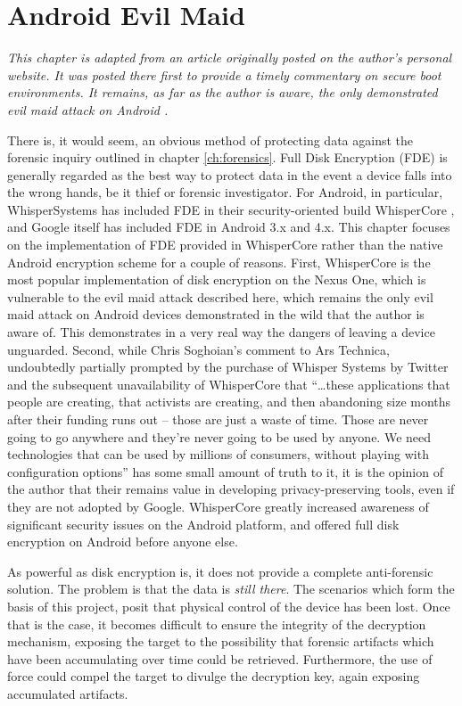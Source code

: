 \chapter{Android Evil Maid}
\label{ch:fde}

\emph{This chapter is adapted from an article originally posted on the author's personal website. It was posted there first to
provide a timely commentary on secure boot environments. It remains, as far as the author is aware, the only demonstrated evil maid
attack on Android \cite{androidevilmaid}.}

There is, it would seem, an obvious method of protecting data against the forensic inquiry outlined in chapter \ref{ch:forensics}.
Full Disk Encryption (FDE) is generally regarded as the best way to protect data in the event a device falls into the wrong hands,
be it thief or forensic investigator.  For Android, in particular, WhisperSystems has included FDE in their security-oriented build
WhisperCore \cite{whispercore}, and Google itself has included FDE in Android 3.x and 4.x. This chapter focuses on the
implementation of FDE provided in WhisperCore rather than the native Android encryption scheme for a couple of reasons. First,
WhisperCore is the most popular implementation of disk encryption on the Nexus One, which is vulnerable to the evil maid attack
described here, which remains the only evil maid attack on Android devices demonstrated in the wild that the author is aware of.
This demonstrates in a very real way the dangers of leaving a device unguarded. Second, while Chris Soghoian's comment to Ars
Technica, undoubtedly partially prompted by the purchase of Whisper Systems by Twitter and the subsequent unavailability of
WhisperCore that ``\ldots these applications that people are creating, that activists are creating, and then
abandoning size months after their funding runs out -- those are just a waste of time. Those are never going to go anywhere and
they're never going to be used by anyone. We need technologies that can be used by millions of consumers, without playing with
configuration options'' \cite{arstechnica} has some small amount of truth to it, it is the opinion of the author that their remains
value in developing privacy-preserving tools, even if they are not adopted by Google. WhisperCore greatly increased awareness of
significant security issues on the Android platform, and offered full disk encryption on Android before anyone else.

As powerful as disk encryption is, it does not provide a complete anti-forensic solution. The problem is that the data is
\emph{still there}.  The scenarios which form the basis of this project, posit that physical control of the device has been lost.
Once that is the case, it becomes difficult to ensure the integrity of the decryption mechanism, exposing the target to the
possibility that forensic artifacts which have been accumulating over time could be retrieved.  Furthermore, the use of force could
compel the target to divulge the decryption key, again exposing accumulated artifacts. 


